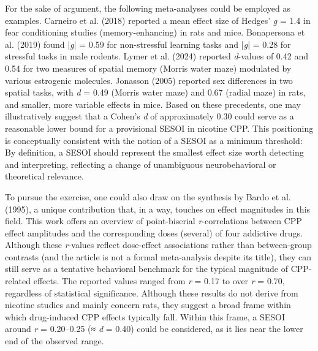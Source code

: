 \documentclass[authordate, meta, issue]{jote-new-article}
\begin{document}
	For the sake of argument, the following meta-analyses could be employed as examples. Carneiro et al. (2018) reported a mean effect size of 	Hedges' \emph{g} = 1.4 in fear conditioning studies (memory-enhancing) in rats and mice. Bonapersona et al. (2019) found |\emph{g}| = 0.59 for non-stressful learning tasks and |\emph{g}| = 0.28 for stressful tasks in male rodents. Lymer et al. (2024) reported \emph{d}-values of 0.42 and 0.54 for two measures of spatial memory (Morris water maze) modulated by various estrogenic molecules. Jonasson (2005) reported sex differences in two spatial tasks, with \emph{d} = 0.49 (Morris water maze) and 0.67 (radial maze) in rats, and smaller, more variable effects in mice. Based on these precedents, one may illustratively suggest that a Cohen's \emph{d} of approximately 0.30 could serve as a reasonable lower bound for a provisional SESOI in nicotine CPP. This positioning is conceptually consistent with the notion of a SESOI as a minimum threshold: By definition, a SESOI should represent the smallest effect size worth detecting and interpreting, reflecting a change of unambiguous neurobehavioral or theoretical relevance.



	To pursue the exercise, one could also draw on the synthesis by Bardo et al. (1995), a unique contribution that, in a way, touches on effect magnitudes in this field. This work offers an overview of point-biserial \emph{r}-correlations between CPP effect amplitudes and the corresponding doses (several) of four addictive drugs. Although these \emph{r}-values reflect dose-effect associations rather than between-group contrasts (and the article is not a formal meta-analysis despite its title), they can still serve as a tentative behavioral benchmark for the typical magnitude of CPP-related effects. The reported values ranged from \emph{r} = 0.17 to over \emph{r} = 0.70, regardless of statistical significance. Although these results do not derive from nicotine studies and mainly concern rats, they suggest a broad frame within which drug-induced CPP effects typically fall. Within this frame, a SESOI around \emph{r} = 0.20--0.25 (≈ \emph{d} = 0.40) could be considered, as it lies near the lower end of the observed range.
\end{document}
